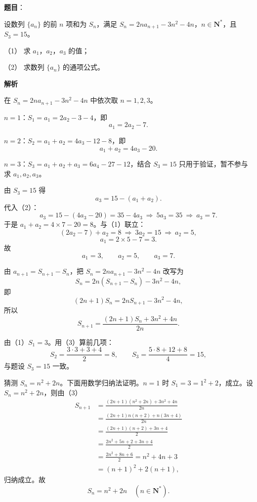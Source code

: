 \begin{answer}

\textbf{题目}：

设数列 $\{a_n\}$ 的前 $n$ 项和为 $S_n$，满足 $S_n=2na_{n+1}-3n^2-4n$，$n\in\mathbf N^*$，且 $S_3=15$。

（1） 求 $a_1$，$a_2$，$a_3$ 的值；

（2） 求数列 $\{a_n\}$ 的通项公式。

\textbf{解析}


在 $S_n=2na_{n+1}-3n^2-4n$ 中依次取 $n=1,2,3$。

$n=1$：$S_1=a_1=2a_2-3-4$，即
\nopagebreak[4]
\[a_1=2a_2-7. \tag{1}\]

$n=2$：$S_2=a_1+a_2=4a_3-12-8$，即
\nopagebreak[4]
\[a_1+a_2=4a_3-20. \tag{2}\]

$n=3$：$S_3=a_1+a_2+a_3=6a_4-27-12$，结合 $S_3=15$ 只用于验证，暂不参与求 $a_1,a_2,a_3$。

由 $S_3=15$ 得
\nopagebreak[4]
\[a_3=15-(a_1+a_2).\]
代入（2）：
\nopagebreak[4]
\[a_3=15-(4a_3-20)=35-4a_3
\ \Longrightarrow\ 5a_3=35
\ \Longrightarrow\ a_3=7.\]
于是 $a_1+a_2=4\times7-20=8$。与（1）联立：
\nopagebreak[4]
\[(2a_2-7)+a_2=8
\ \Longrightarrow\ 3a_2=15
\ \Longrightarrow\ a_2=5,\]
\nopagebreak[4]
\[a_1=2\times5-7=3.\]
故
\nopagebreak[4]
\[a_1=3,\qquad a_2=5,\qquad a_3=7.\]


由 $a_{n+1}=S_{n+1}-S_n$，把 $S_n=2na_{n+1}-3n^2-4n$ 改写为
\nopagebreak[4]
\[S_n=2n(S_{n+1}-S_n)-3n^2-4n,\]
即
\nopagebreak[4]
\[(2n+1)S_n=2nS_{n+1}-3n^2-4n,\]
所以
\nopagebreak[4]
\[S_{n+1}=\frac{(2n+1)S_n+3n^2+4n}{2n}. \tag{3}\]

由（1）$S_1=3$。用（3）算前几项：
\nopagebreak[4]
\[S_2=\frac{3\cdot3+3+4}{2}=8,\qquad
S_3=\frac{5\cdot8+12+8}{4}=15,\]
与题设 $S_3=15$ 一致。

猜测 $S_n=n^2+2n$。下面用数学归纳法证明。$n=1$ 时 $S_1=3=1^2+2$，成立。设 $S_n=n^2+2n$，则由（3）
\nopagebreak[4]
\[\begin{aligned}
S_{n+1}
&=\frac{(2n+1)(n^2+2n)+3n^2+4n}{2n}\\
&=\frac{(2n+1)n(n+2)+n(3n+4)}{2n}\\
&=\frac{(2n+1)(n+2)+3n+4}{2}\\
&=\frac{2n^2+5n+2+3n+4}{2}\\
&=\frac{2n^2+8n+6}{2}
=n^2+4n+3\\
&=(n+1)^2+2(n+1),
\end{aligned}\]
归纳成立。故
\nopagebreak[4]
\[S_n=n^2+2n\quad(n\in\mathbf N^*).\]


\end{answer}
